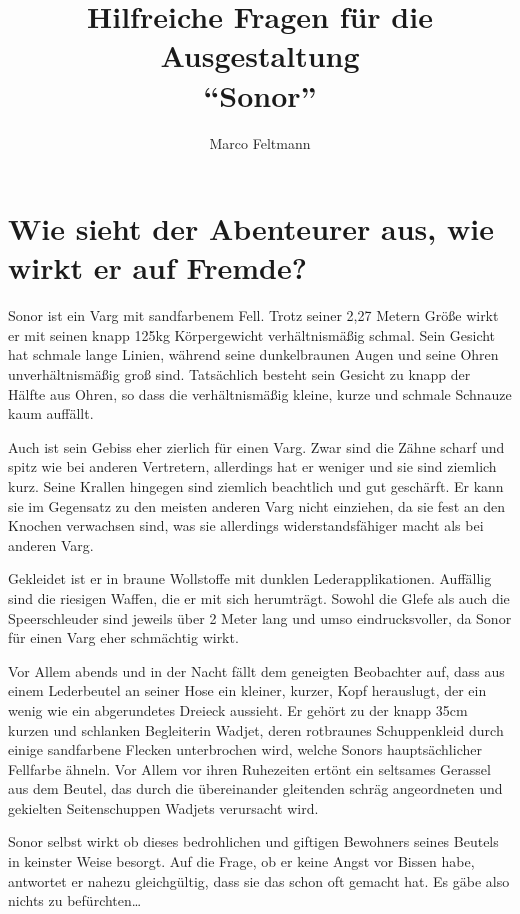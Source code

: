 \documentclass{article}
\author{Marco Feltmann}
\title{Hilfreiche Fragen für die Ausgestaltung \\ \enquote{Sonor} }
\begin{document}
	\maketitle
	
	\tableofcontents
	
	\section[Aussehen]{Wie sieht der Abenteurer aus, wie wirkt er auf Fremde?}
	
	Sonor ist ein Varg mit sandfarbenem Fell. Trotz
	seiner 2,27 Metern Größe wirkt er mit seinen knapp 125kg Körpergewicht
	verhältnismäßig schmal. Sein Gesicht hat schmale lange Linien, während
	seine dunkelbraunen Augen und seine Ohren unverhältnismäßig groß sind.
	Tatsächlich besteht sein Gesicht zu knapp der Hälfte aus Ohren, so dass
	die verhältnismäßig kleine, kurze und schmale Schnauze kaum auffällt.

	Auch ist sein Gebiss eher zierlich für einen Varg. Zwar sind die Zähne
	scharf und spitz wie bei anderen Vertretern, allerdings hat er
	weniger und sie sind ziemlich kurz.
	Seine Krallen hingegen sind ziemlich beachtlich und gut geschärft. Er
	kann sie im Gegensatz zu den meisten anderen Varg nicht einziehen, da
	sie fest an den Knochen verwachsen sind, was sie allerdings
	widerstandsfähiger macht als bei anderen Varg.

	Gekleidet ist er in braune Wollstoffe mit dunklen Lederapplikationen.
	Auffällig sind die riesigen Waffen, die er mit sich herumträgt. Sowohl
	die Glefe als auch die Speerschleuder sind jeweils über 2 Meter lang und
	umso eindrucksvoller, da Sonor für einen Varg eher schmächtig wirkt.

	Vor Allem abends und in der Nacht fällt dem geneigten Beobachter auf,
	dass aus einem Lederbeutel an seiner Hose ein kleiner, kurzer,
	Kopf herauslugt, der ein wenig wie ein abgerundetes Dreieck aussieht.
	Er gehört zu der knapp 35cm kurzen und schlanken Begleiterin Wadjet,
	deren rotbraunes Schuppenkleid durch einige sandfarbene Flecken
	unterbrochen wird, welche Sonors hauptsächlicher Fellfarbe ähneln.
	Vor Allem vor ihren Ruhezeiten ertönt ein seltsames Gerassel aus dem
	Beutel, das durch die übereinander gleitenden schräg angeordneten und
	gekielten Seitenschuppen Wadjets verursacht wird.

	Sonor selbst wirkt ob dieses bedrohlichen und giftigen Bewohners seines
	Beutels in keinster Weise besorgt. Auf die Frage, ob er keine Angst vor
	Bissen habe, antwortet er nahezu gleichgültig, dass sie das schon oft
	gemacht hat. Es gäbe also nichts zu befürchten\ldots
\end{document}
